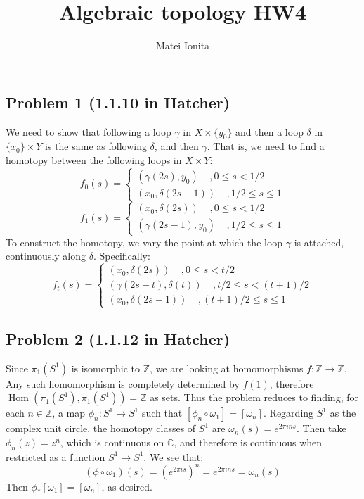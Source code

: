 \documentclass[12 pt]{article}
\title{Algebraic topology HW4}
\author{Matei Ionita}
\newcommand{\Z}{\mathbb{Z}}
\newcommand{\C}{\mathbb{C}}
\DeclareMathOperator{\Hom}{Hom}
\begin{document}
  \maketitle

\subsection*{Problem 1 (1.1.10 in Hatcher)}
We need to show that following a loop $\gamma$ in $X \times \{y_0\}$ and then a loop $\delta$ in $\{x_0\} \times Y$ is the same as following $\delta$, and then $\gamma$. That is, we need to find a homotopy between the following loops in $X \times Y$:
\[     f_0(s) = \left\{  \begin{array} {c}  (\gamma(2s), y_0) \;\;\;\;, 0\leq s < 1/2 \\  (x_0, \delta(2s-1)) \;\;\;\;, 1/2\leq s \leq 1 \end{array} \right.      \]
\[     f_1(s) = \left\{  \begin{array} {c}  (x_0, \delta(2s)) \;\;\;\;, 0\leq s < 1/2 \\ (\gamma(2s-1), y_0)  \;\;\;\;, 1/2\leq s \leq 1 \end{array} \right.      \]
To construct the homotopy, we vary the point at which the loop $\gamma$ is attached, continuously along $\delta$. Specifically:
\[     f_t(s) =     \left\{  \begin{array} {c}  (x_0, \delta(2s)) \;\;\;\;, 0\leq s < t/2 \\ (\gamma(2s-t), \delta(t)) \;\;\;\;, t/2 \leq s < (t+1)/2 \\ (x_0 , \delta(2s-1)) \;\;\;\;, (t+1)/2\leq s \leq 1 \end{array} \right.         \]


\subsection*{Problem 2 (1.1.12 in Hatcher)}
Since $\pi_1(S^1)$ is isomorphic to $\Z$, we are looking at homomorphisms $f: \Z \to \Z$. Any such homomorphism is completely determined by $f(1)$, therefore $\Hom(\pi_1(S^1), \pi_1(S^1)) = \Z$ as sets. Thus the problem reduces to finding, for each $n\in \Z$, a map $\phi_n : S^1 \to S^1$ such that $[\phi_n \circ \omega_1] = [\omega_n]$. Regarding $S^1$ as the complex unit circle, the homotopy classes of $S^1$ are $\omega_n (s) = e^{2\pi in s}$. Then take $\phi_n (z) = z^n$, which is continuous on $\C$, and therefore is continuous when restricted as a function $S^1 \to S^1$. We see that:
\[       (\phi \circ \omega_1) (s) = (e^{2\pi i s})^n = e^{2\pi i n s} = \omega_n (s)     \]
Then $\phi_* [\omega_1] = [\omega_n]$, as desired.
\end{document}
